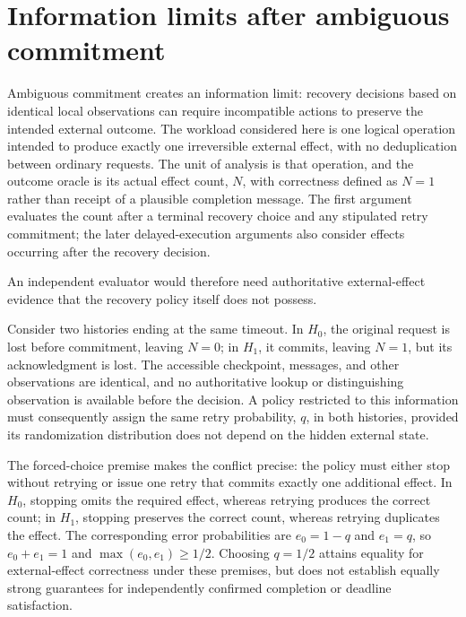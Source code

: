 \documentclass[11pt]{article}
\begin{document}
\section{Information limits after ambiguous commitment}
Ambiguous commitment creates an information limit: recovery decisions based on identical local observations can require incompatible actions to preserve the intended external outcome. The workload considered here is one logical operation intended to produce exactly one irreversible external effect, with no deduplication between ordinary requests. The unit of analysis is that operation, and the outcome oracle is its actual effect count, $N$, with correctness defined as $N=1$ rather than receipt of a plausible completion message. The first argument evaluates the count after a terminal recovery choice and any stipulated retry commitment; the later delayed-execution arguments also consider effects occurring after the recovery decision.

An independent evaluator would therefore need authoritative external-effect evidence that the recovery policy itself does not possess.

\begingroup\setlength{\fboxsep}{9pt}
\noindent{}\endgroup\par\medskip
Consider two histories ending at the same timeout. In $H_0$, the original request is lost before commitment, leaving $N=0$; in $H_1$, it commits, leaving $N=1$, but its acknowledgment is lost. The accessible checkpoint, messages, and other observations are identical, and no authoritative lookup or distinguishing observation is available before the decision. A policy restricted to this information must consequently assign the same retry probability, $q$, in both histories, provided its randomization distribution does not depend on the hidden external state.

The forced-choice premise makes the conflict precise: the policy must either stop without retrying or issue one retry that commits exactly one additional effect. In $H_0$, stopping omits the required effect, whereas retrying produces the correct count; in $H_1$, stopping preserves the correct count, whereas retrying duplicates the effect. The corresponding error probabilities are $e_0=1-q$ and $e_1=q$, so $e_0+e_1=1$ and $\max(e_0,e_1)\geq 1/2$. Choosing $q=1/2$ attains equality for external-effect correctness under these premises, but does not establish equally strong guarantees for independently confirmed completion or deadline satisfaction.
\end{document}
